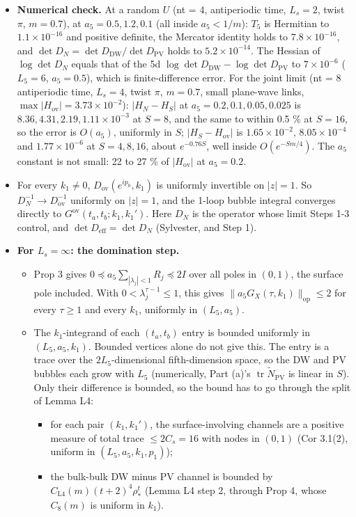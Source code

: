 \documentclass[11pt,a4paper]{article}
\begin{document}
\begin{itemize}
\item{} {\bfseries\boldmath Numerical check.} At a random $U$ (nt = 4, antiperiodic time, $L_s = 2$, twist $\pi$, $m = 0.7$), at $a_5 = 0.5, 1.2, 0.1$ (all inside $a_5 < 1/m$): $T_5$ is Hermitian to $1.1 \times 10^{-16}$ and positive definite, the Mercator identity holds to $7.8 \times 10^{-16}$, and $\det D_N = \det D_{\text{DW}}/\det D_{\text{PV}}$ holds to $5.2 \times 10^{-14}$. The Hessian of $\log\det D_N$ equals that of the 5d $\log\det D_{\text{DW}} - \log\det D_{\text{PV}}$ to $7 \times 10^{-6}$ ($L_5 = 6$, $a_5 = 0.5$), which is finite-difference error. For the joint limit (nt = 8 antiperiodic time, $L_s = 4$, twist $\pi$, $m = 0.7$, small plane-wave links, $\max|H_{\text{ov}}| = 3.73 \times 10^{-2}$): $|H_N - H_S|$ at $a_5 = 0.2, 0.1, 0.05, 0.025$ is $8.36, 4.31, 2.19, 1.11 \times 10^{-3}$ at $S = 8$, and the same to within 0.5 \% at $S = 16$, so the error is $O(a_5)$, uniformly in $S$; $|H_S - H_{\text{ov}}|$ is $1.65 \times 10^{-2}$, $8.05 \times 10^{-4}$ and $1.77 \times 10^{-6}$ at $S = 4, 8, 16$, about $e^{-0.76 S}$, well inside $O(e^{-Sm/4})$. The $a_5$ constant is not small: 22 to 27 \% of $|H_{\text{ov}}|$ at $a_5 = 0.2$.
\item{} For every $k_1 \ne 0$, $D_{\text{ov}}(e^{i p_0}, k_1)$ is uniformly invertible on $|z| = 1$. So $D_N^{-1} \to D_{\text{ov}}^{-1}$ uniformly on $|z| = 1$, and the 1-loop bubble integral converges directly to $G^{\text{ov}}(t_a, t_b; k_1, k_1')$. Here $D_N$ is the operator whose limit Steps 1-3 control, and $\det D_{\text{eff}} = \det D_N$ (Sylvester, and Step 1).
\item{} {\bfseries\boldmath For $L_s = \infty$: the domination step.}
\begin{itemize}
\item{} Prop 3 gives $0 \preceq a_5 \sum_{|\lambda_j| < 1} R_j \preceq 2I$ over all poles in $(0, 1)$, the surface pole included. With $0 < \lambda_j^{\tau - 1} \le 1$, this gives $\|a_5 G_X(\tau, k_1)\|_{\text{op}} \le 2$ for every $\tau \ge 1$ and every $k_1$, uniformly in $(L_5, a_5)$.
\item{} The $k_1$-integrand of each $(t_a, t_b)$ entry is bounded uniformly in $(L_5, a_5, k_1)$. Bounded vertices alone do not give this. The entry is a trace over the $2L_5$-dimensional fifth-dimension space, so the DW and PV bubbles each grow with $L_5$ (numerically, Part (a)'s $\operatorname{tr}\tilde{N}_{\text{PV}}$ is linear in $S$). Only their difference is bounded, so the bound has to go through the split of Lemma L4:
\begin{itemize}
\item{} for each pair $(k_1, k_1')$, the surface-involving channels are a positive measure of total trace $\le 2C_s = 16$ with nodes in $(0, 1)$ (Cor 3.1(2), uniform in $(L_5, a_5, k_1, p_1)$);
\item{} the bulk-bulk DW minus PV channel is bounded by $C_{\text{L4}}(m)(t + 2)^4\rho_*^t$ (Lemma L4 step 2, through Prop 4, whose $C_8(m)$ is uniform in $k_1$).
\end{itemize}


\end{itemize}
\end{itemize}
\end{document}
